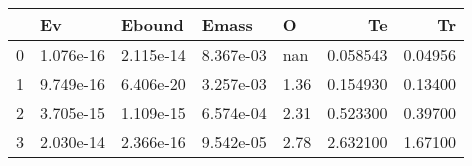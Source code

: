\begin{tabular}{lllllrr}
\toprule
{} &         Ev &     Ebound &      Emass &     O &        Te &       Tr \\
\midrule
0 &  1.076e-16 &  2.115e-14 &  8.367e-03 &   nan &  0.058543 &  0.04956 \\
1 &  9.749e-16 &  6.406e-20 &  3.257e-03 &  1.36 &  0.154930 &  0.13400 \\
2 &  3.705e-15 &  1.109e-15 &  6.574e-04 &  2.31 &  0.523300 &  0.39700 \\
3 &  2.030e-14 &  2.366e-16 &  9.542e-05 &  2.78 &  2.632100 &  1.67100 \\
\bottomrule
\end{tabular}
